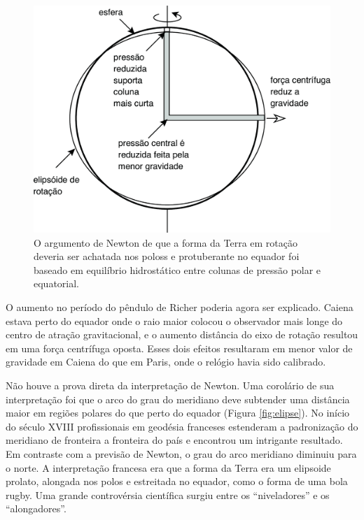\documentclass[]{book}
\theoremstyle{definition}
\theoremstyle{definition}
\theoremstyle{definition}
\theoremstyle{remark}
\begin{document}
\begin{figure}

{\centering \includegraphics[width=0.4\linewidth]{fig/Fig_02.02} 

}

\caption{O argumento de Newton de que a forma da Terra em rotação deveria ser achatada nos poloss e protuberante no equador foi baseado em equilíbrio hidrostático entre colunas de pressão polar e equatorial.}\label{fig:forma}
\end{figure}

O aumento no período do pêndulo de Richer poderia agora ser explicado. Caiena estava perto do equador onde o raio maior colocou o observador mais longe do centro de atração gravitacional, e o aumento distância do eixo de rotação resultou em uma força centrífuga oposta. Esses dois efeitos resultaram em menor valor de gravidade em Caiena do que em Paris, onde o relógio havia sido calibrado.

Não houve a prova direta da interpretação de Newton. Uma corolário de sua interpretação foi que o arco do grau do meridiano deve subtender uma distância maior em regiões polares do que perto do equador (Figura \ref{fig:elipse}). No início do século XVIII profissionais em geodésia franceses estenderam a padronização do meridiano de fronteira a fronteira do país e encontrou um intrigante resultado. Em contraste com a previsão de Newton, o grau do arco meridiano diminuiu para o norte. A interpretação francesa era que a forma da Terra era um elipsoide prolato, alongada nos polos e estreitada no equador, como o forma de uma bola rugby. Uma grande controvérsia científica surgiu entre os ``niveladores'' e os ``alongadores''.
\end{document}
